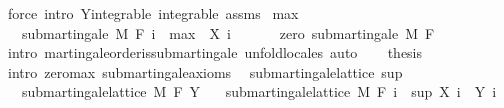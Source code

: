 \begin{isabellebody}
\ {\isacharparenleft}{\kern0pt}force\ intro{\isacharcolon}{\kern0pt}\ Y{\isachardot}{\kern0pt}integrable\ integrable\ assms{\isacharparenright}{\kern0pt}{\isacharplus}{\kern0pt}\isanewline
{}\isamarkupfalse%
%
\endisatagproof
{\isafoldproof}%
%
\isadelimproof
\isanewline
%
\endisadelimproof
\isanewline
{}\isamarkupfalse%
\ max{\isacharunderscore}{\kern0pt}{}{\isacharcolon}{\kern0pt}\isanewline
\ \ \ {\isachardoublequoteopen}submartingale\ M\ F\ {\isacharparenleft}{\kern0pt}{\isasymlambda}i\ {\isasymxi}{\isachardot}{\kern0pt}\ max\ {}\ {\isacharparenleft}{\kern0pt}X\ i\ {\isasymxi}{\isacharparenright}{\kern0pt}{\isacharparenright}{\kern0pt}{\isachardoublequoteclose}\isanewline
%
\isadelimproof
%
\endisadelimproof
%
\isatagproof
{}\isamarkupfalse%
\ {\isacharminus}{\kern0pt}\isanewline
\ \ \isamarkupfalse%
\ zero{\isacharcolon}{\kern0pt}\ submartingale\ M\ F\ {\isachardoublequoteopen}{\isasymlambda}{\isacharunderscore}{\kern0pt}\ {\isacharunderscore}{\kern0pt}{\isachardot}{\kern0pt}\ {}{\isachardoublequoteclose}\ \isamarkupfalse%
\ {\isacharparenleft}{\kern0pt}intro\ martingale{\isacharunderscore}{\kern0pt}order{\isachardot}{\kern0pt}is{\isacharunderscore}{\kern0pt}submartingale{\isacharcomma}{\kern0pt}\ unfold{\isacharunderscore}{\kern0pt}locales{\isacharcomma}{\kern0pt}\ auto{\isacharparenright}{\kern0pt}\isanewline
\ \ \isamarkupfalse%
\ {\isacharquery}{\kern0pt}thesis\ \isamarkupfalse%
\ {\isacharparenleft}{\kern0pt}intro\ zero{\isachardot}{\kern0pt}max\ submartingale{\isacharunderscore}{\kern0pt}axioms{\isacharparenright}{\kern0pt}\isanewline
{}\isamarkupfalse%
%
\endisatagproof
{\isafoldproof}%
%
\isadelimproof
\isanewline
%
\endisadelimproof
\isanewline
{}\isamarkupfalse%
\isanewline
\isanewline
{}\isamarkupfalse%
\ {\isacharparenleft}{\kern0pt}\ submartingale{\isacharunderscore}{\kern0pt}lattice{\isacharparenright}{\kern0pt}\ sup{\isacharcolon}{\kern0pt}\isanewline
\ \ \ {\isachardoublequoteopen}submartingale{\isacharunderscore}{\kern0pt}lattice\ M\ F\ Y{\isachardoublequoteclose}\isanewline
\ \ \ {\isachardoublequoteopen}submartingale{\isacharunderscore}{\kern0pt}lattice\ M\ F\ {\isacharparenleft}{\kern0pt}{\isasymlambda}i\ {\isasymxi}{\isachardot}{\kern0pt}\ sup\ {\isacharparenleft}{\kern0pt}X\ i\ {\isasymxi}{\isacharparenright}{\kern0pt}\ {\isacharparenleft}{\kern0pt}Y\ i\ {\isasymxi}{\isacharparenright}{\kern0pt}{\isacharparenright}{\kern0pt}{\isachardoublequoteclose}\isanewline

\end{isabellebody}
